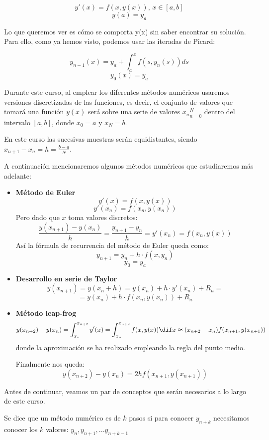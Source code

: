 \documentclass{apuntes}
\begin{document}
\[y'(x) = f(x,y(x)) \text{, } x∈[a,b]\]
\[y(a)=y_a\]

Lo que queremos ver es cómo se comporta y(x) sin saber encontrar su solución. Para ello, como ya hemos visto, podemos usar las iteradas de Picard:

\[y_{n-1}(x) = y_a + \int_a^x f(s,y_n(s)) ds\]
\[y_0(x) = y_a\]

\begin{remark}
Durante este curso, al emplear los diferentes métodos numéricos usaremos versiones discretizadas de las funciones, es decir, el conjunto de valores que tomará una función $y(x)$ será sobre una serie de valores ${x_n}_{n=0}^N$ dentro del intervalo $[a,b]$, donde $x_0=a$ y $x_N=b$.
\end{remark}
En este curso las sucesivas muestras serán equidistantes, siendo $x_{n+1}-x_n=h=\frac{b-a}{N}$.

A continuación mencionaremos algunos métodos numéricos que estudiaremos más adelante:
\begin{itemize}
	\item \textbf{Método de Euler}
	\[y'(x) = f(x,y(x))\]
	\[y'(x_n) = f(x_n,y(x_n))\]
	Pero dado que $x$ toma valores discretos:
	\[\frac{y(x_{n+1}) - y(x_n)}{h} = \frac{y_{n+1} - y_n}{h} = y'(x_n) = f(x_n,y(x))\]
	Así la fórmula de recurrencia del método de Euler queda como:
	\[y_{n+1} = y_n + h·f(x,y_n)\]
	\[y_0=y_a\]

	\item \textbf{Desarrollo en serie de Taylor}
	\[y(x_{n+1}) = y(x_n+h) = y(x_n) + h·y'(x_n) + R_n =\]
	\[= y(x_n) + h·f(x_n,y(x_n)) + R_n\]

	\item \textbf{Método leap-frog}
	\[y(x_{n+2}) - y(x_n) = \int_{x_n}^{x_{n+2}} y'(x) = \int_{x_n}^{x_{n+2}} f(x,y(x))\dif x \approx (x_{n+2}-x_n)f(x_{n+1},y(x_{n+1}))\]
	donde la aproximación se ha realizado empleando la regla del punto medio.

	Finalmente nos queda:
	\[y(x_{n+2}) - y(x_n) = 2h f(x_{n+1},y(x_{n+1}))\]
\end{itemize}

Antes de continuar, veamos un par de conceptos que serán necesarios a lo largo de este curso.

\begin{defn}
Se dice que un método numérico es de $k$ pasos si para conocer $y_{n+k}$ necesitamos conocer los $k$ valores: $y_{n}, y_{n+1},... y_{n+k-1}$
\end{defn}
\end{document}
